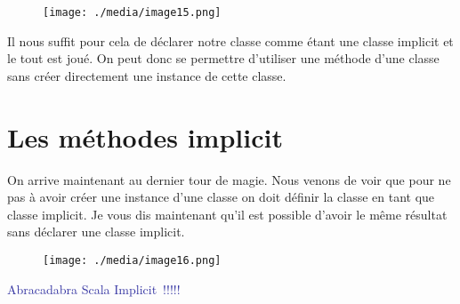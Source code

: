 \documentclass[12pt]{article}
\begin{document}
\begin{figure}[H]
	\begin{Center}
		\texttt{[image: ./media/image15.png]}
	\end{Center}
\end{figure}



\par


\vspace{\baselineskip}
Il nous suffit pour cela de déclarer notre classe comme étant une classe implicit et le tout est joué. On peut donc se permettre d’utiliser une méthode d’une classe sans créer directement une instance de cette classe.\par


\vspace{\baselineskip}
\section*{Les méthodes implicit}

\vspace{\baselineskip}
On arrive maintenant au dernier tour de magie. Nous venons de voir que pour ne pas à avoir créer une instance d’une classe on doit définir la classe en tant que classe implicit. Je vous dis maintenant qu’il est possible d’avoir le même résultat sans déclarer une classe implicit.\par


\vspace{\baselineskip}



\begin{figure}[H]
	\begin{Center}
		\texttt{[image: ./media/image16.png]}
	\end{Center}
\end{figure}



\par


\vspace{\baselineskip}
\begin{Center}
{\fontsize{28pt}{33.6pt}\selectfont \textcolor[HTML]{3030A0}{Abracadabra Scala Implicit !!!!!}\par}
\end{Center}\par
\end{document}
